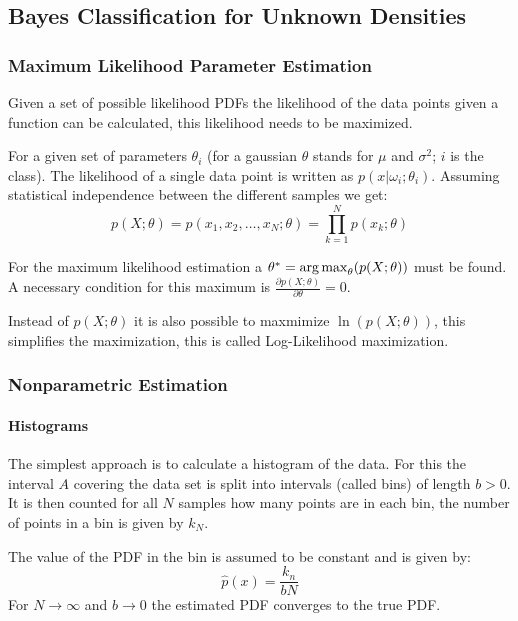 \subsection{Bayes Classification for Unknown Densities}
\subsubsection{Maximum Likelihood Parameter Estimation}
Given a set of possible likelihood PDFs the likelihood of the data points given a function can be calculated, this likelihood needs to be maximized.

For a given set of parameters $\theta_i$ (for a gaussian $\theta$ stands for $\mu$ and $\sigma^2$; $i$ is the class). The likelihood of a single data point is written as $p(x | \omega_i; \theta_i)$.
Assuming statistical independence between the different samples we get:
\begin{equation*}
    p(X; \theta) = p(x_1, x_2, \ldots, x_N; \theta) = \prod_{k=1}^N p(x_k; \theta)
\end{equation*}

For the maximum likelihood estimation a $\theta^* = \operatorname*{arg\,max}_\theta(p(X; \theta))$ must be found.
A necessary condition for this maximum is $\frac{\partial p(X; \theta)}{\partial \theta} = 0$.

Instead of $p(X; \theta)$ it is also possible to maxmimize $\ln(p(X; \theta))$, this simplifies the maximization, this is called Log-Likelihood maximization.

\subsubsection{Nonparametric Estimation}
\paragraph{Histograms}
The simplest approach is to calculate a histogram of the data. For this the interval $A$ covering the data set is split into intervals (called bins) of length $b > 0$. It is then counted for all $N$ samples how many points are in each bin, the number of points in a bin is given by $k_N$.

The value of the PDF in the bin is assumed to be constant and is given by:
\begin{equation*}
    \hat{p}(x) = \frac{k_n}{b N}
\end{equation*}
For $N \to \infty$ and $b \to 0$ the estimated PDF converges to the true PDF.

